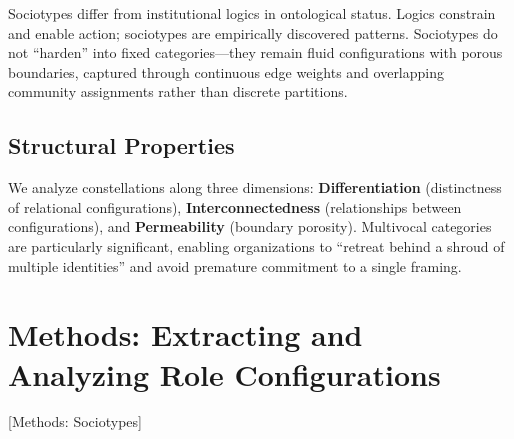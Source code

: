 \documentclass[../main.tex]{subfiles}
\begin{document}
\begin{center}
\end{center}

Sociotypes differ from institutional logics in ontological status. Logics constrain and enable action; sociotypes are empirically discovered patterns. Sociotypes do not ``harden'' into fixed categories---they remain fluid configurations with porous boundaries, captured through continuous edge weights and overlapping community assignments rather than discrete partitions.

\subsection{Structural Properties}

We analyze constellations along three dimensions: \textbf{Differentiation} (distinctness of relational configurations), \textbf{Interconnectedness} (relationships between configurations), and \textbf{Permeability} (boundary porosity). Multivocal categories are particularly significant, enabling organizations to ``retreat behind a shroud of multiple identities'' and avoid premature commitment to a single framing.


\section{Methods: Extracting and Analyzing Role Configurations}[Methods: Sociotypes]
\end{document}
